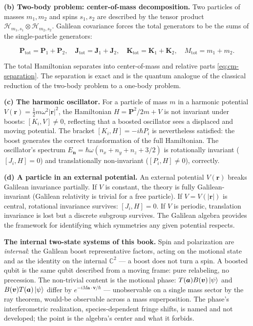 \medskip\noindent\textbf{(b) Two-body problem: center-of-mass decomposition.} Two particles of masses $m_{1}, m_{2}$ and spins $s_{1}, s_{2}$ are described by the tensor product $\mathcal{H}_{m_{1},s_{1}}\otimes\mathcal{H}_{m_{2},s_{2}}$. Galilean covariance forces the total generators to be the sums of the single-particle generators:
\begin{linenomath}
\begin{equation}
\bm P_{\mathrm{tot}} = \bm P_{1}+\bm P_{2},\quad
\bm J_{\mathrm{tot}} = \bm J_{1}+\bm J_{2},\quad
\bm K_{\mathrm{tot}} = \bm K_{1}+\bm K_{2},\quad
M_{\mathrm{tot}} = m_{1}+m_{2}.
\label{eq:two-body-generators}
\end{equation}
\end{linenomath}
The total Hamiltonian separates into center-of-mass and relative parts \eqref{eq:cm-separation}. The separation is exact and is the quantum analogue of the classical reduction of the two-body problem to a one-body problem.

\medskip\noindent\textbf{(c) The harmonic oscillator.} For a particle of mass $m$ in a harmonic potential $V(\bm r) = \frac{1}{2}m\omega^{2}|\bm r|^{2}$, the Hamiltonian $H = \bm P^{2}/2m + V$ is not invariant under boosts: $[K_i,V] \neq 0$, reflecting that a boosted oscillator sees a displaced and moving potential. The bracket $[K_i,H] = -i\hbar P_i$ is nevertheless satisfied: the boost generates the correct transformation of the full Hamiltonian. The oscillator's spectrum $E_{\bm n} = \hbar\omega(n_{x}+n_{y}+n_{z}+3/2)$ is rotationally invariant ($[J_i,H]=0$) and translationally non-invariant ($[P_i,H] \neq 0$), correctly.

\medskip\noindent\textbf{(d) A particle in an external potential.} An external potential $V(\bm r)$ breaks Galilean invariance partially. If $V$ is constant, the theory is fully Galilean-invariant (Galilean relativity is trivial for a free particle). If $V = V(|\bm r|)$ is central, rotational invariance survives: $[J_i,H]=0$. If $V$ is periodic, translation invariance is lost but a discrete subgroup survives. The Galilean algebra provides the framework for identifying which symmetries any given potential respects.

\medskip\noindent\textbf{The internal two-state systems of this book.} Spin and polarization are \emph{internal}: the Galilean boost representative factors, acting on the motional state and as the identity on the internal $\mathbb C^{2}$ --- a boost does not turn a spin. A boosted qubit is the same qubit described from a moving frame: pure relabeling, no precession. The non-trivial content is the motional phase: $T(\bm a)B(\bm v)\ket{\psi}$ and $B(\bm v)T(\bm a)\ket{\psi}$ differ by $e^{-iM\bm a\cdot\bm v/\hbar}$ --- unobservable on a single mass sector by the ray theorem, would-be observable across a mass superposition. The phase's interferometric realization, species-dependent fringe shifts, is named and not developed; the point is the algebra's center and what it forbids.

